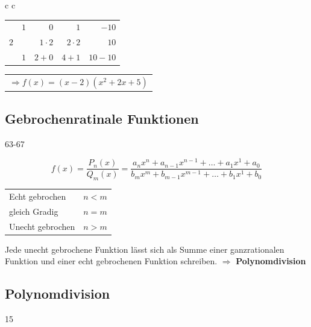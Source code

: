 {\setlength{\tabcolsep}{6pt}
\begin{tabular}{c c}
    {\setlength{\tabcolsep}{6pt}
    \begin{tabular}{l| r r r r}
                & $1$        & $0$            & $1$             & $-10$ \\
        $2$     &            & $1 \cdot 2$    & $2 \cdot 2$     & $10$ \\
        \hline
                & $1$        & $2+0$          & $4+1$           & $10-10$\\
    \end{tabular}}
    \begin{tabular}{l}
        $\Rightarrow f(x) = (x-2)(x^2+2x+5)$ \\
    \end{tabular}
\end{tabular}}

\subsection{Gebrochenratinale Funktionen}{63-67}

\[
f(x) = \frac{P_n(x)}{Q_m(x)} = \frac{a_nx^n + a_{n-1}x^{n-1} + \ldots + a_1x^1 + a_0}{b_mx^m + b_{m-1}x^{m-1} + \ldots + b_1x^1 + b_0}
\]

\begin{tabular}{l l}
    Echt gebrochen      &   $n < m$ \\
    gleich Gradig       &   $n = m$ \\
    Unecht gebrochen    &   $n > m$
\end{tabular}

\vspace{0.2cm}
Jede unecht gebrochene Funktion lässt sich als Summe einer ganzrationalen Funktion und einer echt gebrochenen Funktion schreiben. $\Rightarrow$ \textbf{Polynomdivision}

\subsection{Polynomdivision }{15}

